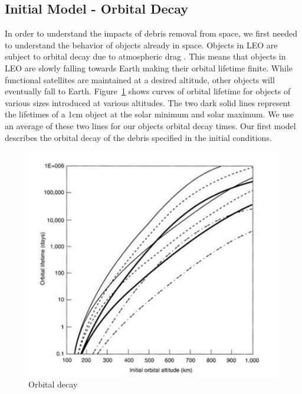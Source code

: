 \documentclass[pre,12pt]{revtex4-1}
\begin{document}
\subsection{Initial Model - Orbital Decay}
In order to understand the impacts of debris removal from space, we first needed to understand the behavior of objects already in space. Objects in LEO are subject to orbital decay due to atmospheric drag \cite{orbitalDebris}. This means that objects in LEO are slowly falling towards Earth making their orbital lifetime finite. While functional satellites are maintained at a desired altitude, other objects will eventually fall to Earth. Figure~\ref{fig:orbital_decay} shows curves of orbital lifetime for objects of various sizes introduced at various altitudes. The two dark solid lines represent the lifetimes of a 1cm object at the solar minimum and solar maximum. We use an average of these two lines for our objects orbital decay times. Our first model describes the orbital decay of the debris specified in the initial conditions.

\begin{figure}
	\includegraphics[width=\linewidth]{"Figures/orbital_decay"}
	\caption{Orbital decay}
	\label{fig:orbital_decay}
\end{figure}
\end{document}

